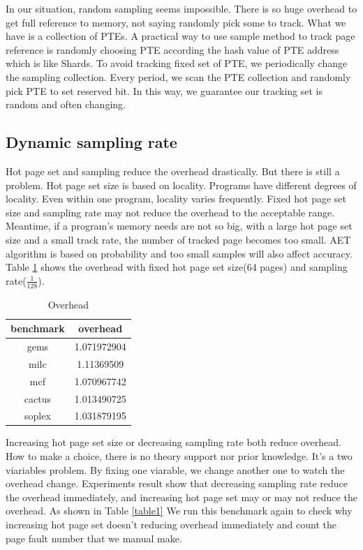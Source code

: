 \documentclass[10pt,twocolumn]{article}
\begin{document}
In our situation, random sampling seems impossible. There is so huge overhead to get full reference to memory, not saying randomly pick some to track. What we have is a collection of PTEs. A practical way to use sample method to track page reference is randomly choosing PTE according the hash value of PTE address which is like Shards. To avoid tracking fixed set of PTE, we periodically change the sampling collection. Every period, we scan the PTE collection and randomly pick PTE to set reserved bit. In this way, we guarantee our tracking set is random and often changing.

\subsection{Dynamic sampling rate}
Hot page set and sampling reduce the overhead drastically. But there is still a problem. Hot page set size is based on locality. Programs have different degrees of locality. Even within one program, locality varies frequently. Fixed hot page set size and sampling rate may not reduce the overhead to the acceptable range. Meantime, if a program's memory needs are not so big, with a large hot page set size and a small track rate, the number of tracked page becomes too small. AET algorithm is based on probability and too small samples will also affect accuracy. Table \ref{table2} shows the overhead with fixed hot page set size(64 pages) and sampling rate($\frac{1}{128}$).

\vspace{3pt}
\renewcommand\arraystretch{1.5}
\begin{table}[H]
	\caption{Overhead}\label{table2}
	\centering
	\begin{tabular}{|c|c|}
		\hline
		benchmark & overhead \\
		\hline
		gems & 1.071972904 \\
		\hline
		milc & 1.11369509 \\
		\hline
		mcf & 1.070967742 \\
		\hline
		cactus & 1.013490725 \\
		\hline
		soplex & 1.031879195 \\
		\hline
		
	\end{tabular}
\end{table}


Increasing hot page set size or decreasing sampling rate both reduce overhead. How to make a choice, there is no theory support nor prior knowledge. It's a two viariables problem. By fixing one viarable, we change another one to watch the overhead change. Experiments result show that decreasing sampling rate reduce the overhead immediately, and increasing hot page set may or may not reduce the overhead. As shown in Table \ref{table1} We run this benchmark again to check why increasing hot page set doesn't reducing overhead immediately and count the page fault number that we manual make.
\end{document}
